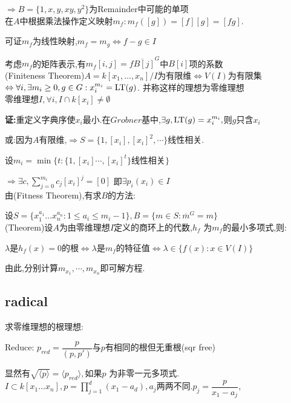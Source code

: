 $\Rightarrow B=\{ 1,x,y,xy,y^2\}$为Remainder中可能的单项
\\

在$ A$中根据乘法操作定义映射$ m_f:m_f([g])=[f][g]=[fg]$.

可证$ m_f$为线性映射,$ m_f=m_g\Leftrightarrow f-g\in I$

考虑$ m_f$的矩阵表示,有$ m_f[i,j]=\overline{f B[j]}^G$中$ B[i]$项的系数
\\

(Finiteness Theorem)$ A=k[x_1,\ldots,x_n]/I$为有限维$ \Leftrightarrow V(I)$为有限集
$ \Leftrightarrow \forall i,\exists m_i\ge0,g\in G:x_i^{m_i}=\operatorname{\tiny{LT}}(g)$.
并称这样的理想为零维理想
\\

零维理想$ I,\forall i,I\cap k[x_i]\neq \emptyset$

{\bf 证:}重定义字典序使$ x_i$最小.在$ Grobner$基中,$ \exists g,\operatorname{\tiny{LT}}(g)=x_i^{m_i},$则$ g$只含$ x_i$

或:因为$ A$有限维,$\Rightarrow  S=\{1,[x_i],[x_i]^2,\cdots\}$线性相关.

设$ m_i=\min\{t:\{ 1,[x_i]\cdots,[x_i]^{t} \}\texttt{线性相关}\}$

$ \Rightarrow \exists c,\sum_{j=0}^{m_i}{c_j[x_i]^j=[0]}$ 即$\exists p_i(x_i)\in I$
\\

由(Fitness Theorem),有求$ B$的方法:

设$ S=\{ x_1^{a_1}\ldots x_n^{a_n}:1\le a_i\le m_i-1\},B=\{ m\in S:\overline{m}^G=m\}$
\\

(Theorem)设$ A$为由零维理想$ I$定义的商环上的代数,$ h_f$ 为$m_f$的最小多项式,则:

$ \lambda $是$ h_f(x)=0$的根$\Leftrightarrow \lambda$是$ m_f$的特征值$ \Leftrightarrow \lambda\in \{ f(x):x\in V(I)\}$

由此,分别计算$ m_{x_1},\cdots,m_{x_n}$即可解方程.

\subsection{radical}
求零维理想的根理想:

Reduce: $ p_{red}=\dfrac{p}{(p,p')}$与$ p$有相同的根但无重根(sqr free)

显然有$ \sqrt{\langle p \rangle}=\langle p_{red} \rangle,$如果$ p$ 为非零一元多项式.
\\

$ I\subset k[x_1\ldots x_n],p=\prod_{j=1}^{d}{( x_1-a_d )},a_j$两两不同.$ p_j=\dfrac{p}{x_1-a_j}$,

